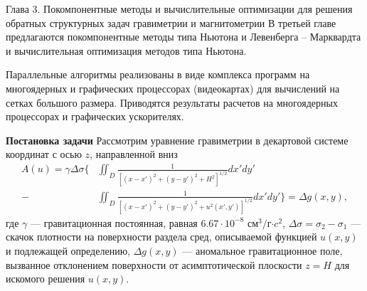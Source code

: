 \documentclass[10pt,pdf, mathserif, hyperref={unicode}]{beamer}
\begin{document}
\begin{frame}{Глава 3. Покомпонентные методы и вычислительные оптимизации для решения обратных структурных задач гравиметрии и магнитометрии}
	В третьей главе предлагаются покомпонентные методы типа Ньютона и Левенберга -- Марквардта и вычислительная оптимизация методов типа Ньютона. 
	
	Параллельные алгоритмы реализованы в виде комплекса программ на многоядерных и графических процессорах (видеокартах) для вычислений на сетках большого размера. Приводятся результаты расчетов на многоядерных процессорах и графических ускорителях. 
	
\end{frame}
\begin{frame}{\small\textbf{Постановка задачи}}
	Рассмотрим уравнение гравиметрии в декартовой системе координат с осью $z$, направленной вниз 
	\begin{equation*}
	\begin{aligned}
	A(u)=\gamma\Delta\sigma \bigg\{ &\iint_{D} \frac{1}{[(x-x')^2+(y-y')^2+H^2]^{1/2}}dx'dy' \\
	- &\iint_{D} \frac{1}{[(x-x')^2+(y-y')^2+u^2(x',y')]^{1/2}}dx'dy'\bigg\}=\Delta g(x,y),
	\end{aligned} 
	\end{equation*}
	где $\gamma$ --- гравитационная постоянная, равная $6.67\cdot10^{-8}$ см$^3/$г$\cdot c^2$, $\Delta\sigma=\sigma_2-\sigma_1$ --- скачок плотности на поверхности раздела сред, описываемой функцией $u(x,y)$ и подлежащей определению, $\Delta g(x,y)$ --- аномальное гравитационное поле, вызванное отклонением поверхности от асимптотической плоскости $z=H$ для искомого решения $u(x,y)$.
\end{frame}
\end{document}
